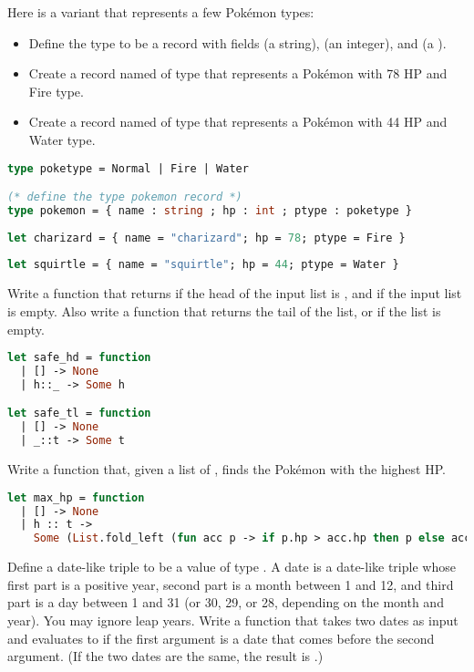 \problem[pokerecord]
Here is a variant that represents a few Pokémon types:
\begin{itemize}
  \item Define the type  to be a record with fields  (a string),  (an integer), and  (a ).
  \item Create a record named  of type  that represents a Pokémon with 78 HP and Fire type.
  \item Create a record named  of type  that represents a Pokémon with 44 HP and Water type.
\end{itemize}

\begin{lstlisting}[language=OCaml]
type poketype = Normal | Fire | Water

(* define the type pokemon record *)
type pokemon = { name : string ; hp : int ; ptype : poketype }
	
let charizard = { name = "charizard"; hp = 78; ptype = Fire }
	
let squirtle = { name = "squirtle"; hp = 44; ptype = Water }
\end{lstlisting}

Write a function  that returns  if the head of the input list is , and  if the input list is empty.
Also write a function  that returns the tail of the list, or  if the list is empty.

\begin{lstlisting}[language=OCaml]
let safe_hd = function
  | [] -> None
  | h::_ -> Some h

let safe_tl = function
  | [] -> None
  | _::t -> Some t
\end{lstlisting}

\problem[pokefun]
Write a function  that, given a list of , finds the Pokémon with the highest HP.

\begin{lstlisting}[language=OCaml]
let max_hp = function
  | [] -> None
  | h :: t ->
    Some (List.fold_left (fun acc p -> if p.hp > acc.hp then p else acc) h t)
\end{lstlisting}

Define a date-like triple to be a value of type . A date is a date-like triple whose first part is a positive year, second part is a month between 1 and 12, and third part is a day between 1 and 31 (or 30, 29, or 28, depending on the month and year). You may ignore leap years.
Write a function  that takes two dates as input and evaluates to  if the first argument is a date that comes before the second argument. (If the two dates are the same, the result is .)

